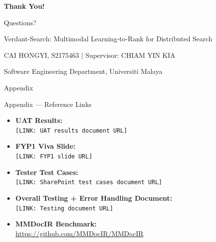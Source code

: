 \documentclass[aspectratio=169,xcolor=dvipsnames]{beamer}
\begin{document}
\begin{frame}
  \Huge{\centerline{\textbf{Thank You!}}}
  \vspace{1cm}
  \Large{\centerline{Questions?}}
  \vspace{1cm}
  \normalsize
  \centerline{Verdant-Search: Multimodal Learning-to-Rank for Distributed Search}
  \centerline{CAI HONGYI, S2175463 $\mid$ Supervisor: CHIAM YIN KIA}
  \centerline{Software Engineering Department, Universiti Malaya}
\end{frame}

\begin{frame}{\centering Appendix}
\end{frame}

\begin{frame}{Appendix — Reference Links}
  \small
  \begin{itemize}
    \item \textbf{UAT Results:}\\
      \scriptsize\texttt{[LINK: UAT results document URL]}
    \vspace{.5em}
    \item \textbf{FYP1 Viva Slide:}\\
      \scriptsize\texttt{[LINK: FYP1 slide URL]}
    \vspace{.5em}
    \item \textbf{Tester Test Cases:}\\
      \scriptsize\texttt{[LINK: SharePoint test cases document URL]}
    \vspace{.5em}
    \item \textbf{Overall Testing + Error Handling Document:}\\
      \scriptsize\texttt{[LINK: Testing document URL]}
    \vspace{.5em}
    \item \textbf{MMDocIR Benchmark:}\\
      \scriptsize\url{https://github.com/MMDocIR/MMDocIR}
  \end{itemize}
\end{frame}
\end{document}
